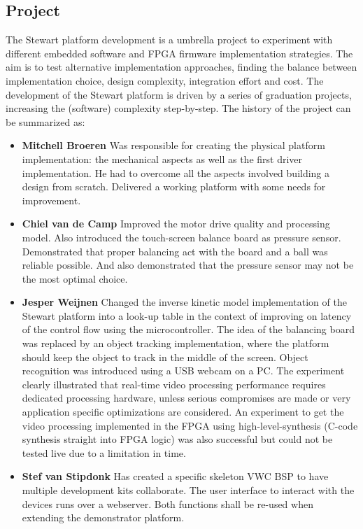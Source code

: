 \documentclass{article}
\begin{document}
\subsection{Project}\label{project-background}
The Stewart platform development is a umbrella project to experiment with
different embedded software and FPGA firmware implementation strategies. The aim
is to test alternative implementation approaches, finding the balance between
implementation choice, design complexity, integration effort and cost. The
development of the Stewart platform is driven by a series of graduation projects,
increasing the (software) complexity step-by-step. The history of the project
can be summarized as: 
\begin{itemize} 
\item[] \textbf{Mitchell Broeren} Was
responsible for creating the physical platform implementation: the mechanical
aspects as well as the first driver implementation. He had to overcome all the
aspects involved building a design from scratch. Delivered a working platform
with some needs for improvement.
\item[]\textbf{Chiel van de
Camp} Improved the motor drive quality and processing model. Also introduced the
touch-screen balance board as pressure sensor. Demonstrated that proper
balancing act with the board and a ball was reliable possible. And also
demonstrated that the pressure sensor may not be the most optimal choice.
\item[]\textbf{Jesper Weijnen} Changed the inverse kinetic model implementation
of the Stewart platform into a look-up table in the context of improving on
latency of the control flow using the microcontroller. The idea of the balancing
board was replaced by an object tracking implementation, where the platform
should keep the object to track in the middle of the screen. Object recognition
was introduced using a USB webcam on a PC\@. The experiment clearly illustrated
that real-time video processing performance requires dedicated processing
hardware, unless serious compromises are made or very application specific
optimizations are considered. An experiment to get the video processing
implemented in the FPGA using high-level-synthesis (C-code synthesis straight
into FPGA logic) was also successful but could not be tested live due to a
limitation in time. 
\item[]\textbf{Stef van Stipdonk} Has created a specific
skeleton VWC BSP to have multiple development kits collaborate. The user
interface to interact with the devices runs over a webserver. Both functions
shall be re-used when extending the demonstrator platform. \end{itemize}
\end{document}
